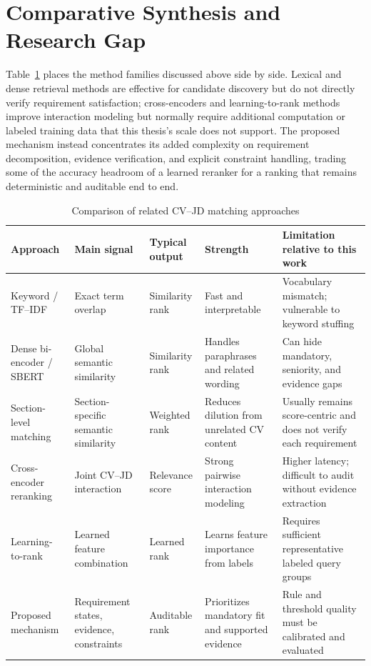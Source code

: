\documentclass[12pt,a4paper,oneside]{report}
\begin{document}
\section{Comparative Synthesis and Research Gap}
Table~\ref{tab:related-work} places the method families discussed above side by side. Lexical and dense retrieval methods are effective for candidate discovery but do not directly verify requirement satisfaction; cross-encoders and learning-to-rank methods improve interaction modeling but normally require additional computation or labeled training data that this thesis's scale does not support. The proposed mechanism instead concentrates its added complexity on requirement decomposition, evidence verification, and explicit constraint handling, trading some of the accuracy headroom of a learned reranker for a ranking that remains deterministic and auditable end to end.

\begin{table}[htbp]
\centering
\caption{Comparison of related CV--JD matching approaches}
\label{tab:related-work}
\begin{tabularx}{\textwidth}{p{}p{}p{}XX}
\toprule
Approach & Main signal & Typical output & Strength & Limitation relative to this work \\
\midrule
Keyword / TF--IDF & Exact term overlap & Similarity rank & Fast and interpretable & Vocabulary mismatch; vulnerable to keyword stuffing \\
Dense bi-encoder / SBERT & Global semantic similarity & Similarity rank & Handles paraphrases and related wording & Can hide mandatory, seniority, and evidence gaps \\
Section-level matching & Section-specific semantic similarity & Weighted rank & Reduces dilution from unrelated CV content & Usually remains score-centric and does not verify each requirement \\
Cross-encoder reranking & Joint CV--JD interaction & Relevance score & Strong pairwise interaction modeling & Higher latency; difficult to audit without evidence extraction \\
Learning-to-rank & Learned feature combination & Learned rank & Learns feature importance from labels & Requires sufficient representative labeled query groups \\
Proposed mechanism & Requirement states, evidence, constraints & Auditable rank & Prioritizes mandatory fit and supported evidence & Rule and threshold quality must be calibrated and evaluated \\
\bottomrule
\end{tabularx}
\end{table}
\end{document}
